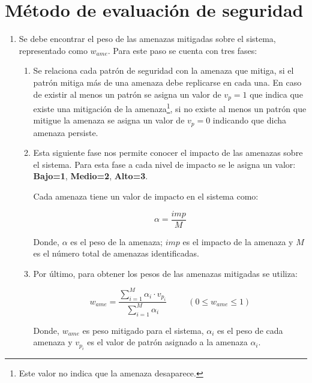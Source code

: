 \section{Método de evaluación de seguridad} 


\begin{enumerate}[label=Paso \arabic*:,leftmargin=*]
\setcounter{enumi}{0}
\item Se debe encontrar el peso de las amenazas mitigadas sobre el sistema, representado como $w_{ame}$. Para este paso se cuenta con tres fases:

\begin{enumerate}[noitemsep]
	\item Se relaciona cada patrón de seguridad con la amenaza que mitiga, si el patrón mitiga más de una amenaza debe replicarse en cada una. En caso de existir al menos un patrón se asigna un valor de $v_p=1$ que indica que existe una mitigación de la amenaza\footnote{Este valor no indica que la amenaza desaparece.}, si no existe al menos un patrón que mitigue la amenaza se asigna un valor de $v_p=0$ indicando que dicha amenaza persiste.
	 
	\item Esta siguiente fase nos permite conocer el impacto de las amenazas sobre el sistema. Para esta fase a cada nivel de impacto se le asigna un valor: \textbf{Bajo=1}, \textbf{Medio=2}, \textbf{Alto=3}.
	
	\vspace{0.3cm}
	
	Cada amenaza tiene un valor de impacto en el sistema como:
	
	\begin{equation*}
		\alpha= \frac{imp}{M}
	\end{equation*}
 
 	Donde, $\alpha$ es el peso de la amenaza; $imp$ es el impacto de la amenaza y $M$ es el número total de amenazas identificadas. 
 
	\item Por último, para obtener los pesos de las amenazas mitigadas se utiliza:
	
	\begin{equation*}
		w_{ame}= \frac{\displaystyle\sum_{i=1}^{M}\alpha_i \cdot v_{p_i}}{\displaystyle\sum_{i=1}^{M}\alpha_i} \hspace{30pt} (0 \leq w_{ame} \leq 1)
	\end{equation*}
	
	Donde, $w_{ame}$ es peso mitigado para el sistema, $\alpha_i$ es el peso de cada amenaza y $v_{p_i}$ es el valor de patrón asignado a la amenaza $\alpha_i$.


\end{enumerate}
\end{enumerate}
